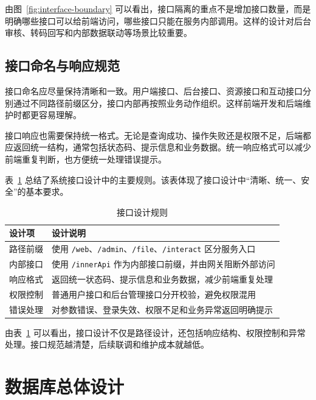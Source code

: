 由图~\ref{fig:interface-boundary} 可以看出，接口隔离的重点不是增加接口数量，而是明确哪些接口可以给前端访问，哪些接口只能在服务内部调用。这样的设计对后台审核、转码回写和内部数据联动等场景比较重要。

\subsection{接口命名与响应规范}
\label{subsec:api-response-design}

接口命名应尽量保持清晰和一致。用户端接口、后台接口、资源接口和互动接口分别通过不同路径前缀区分，接口内部再按照业务动作组织。这样前端开发和后端维护时都更容易理解。

接口响应也需要保持统一格式。无论是查询成功、操作失败还是权限不足，后端都应返回统一结构，通常包括状态码、提示信息和业务数据。统一响应格式可以减少前端重复判断，也方便统一处理错误提示。

表~\ref{tab:interface-design-rule} 总结了系统接口设计中的主要规则。该表体现了接口设计中“清晰、统一、安全”的基本要求。

\begin{table}[htbp]
  \centering
  \caption{接口设计规则}
  \label{tab:interface-design-rule}
  \begin{tabular}{p{}p{}}
    \hline
    \textbf{设计项} & \textbf{设计说明} \\
    \hline
    路径前缀 & 使用 \texttt{/web}、\texttt{/admin}、\texttt{/file}、\texttt{/interact} 区分服务入口 \\
    内部接口 & 使用 \texttt{/innerApi} 作为内部接口前缀，并由网关阻断外部访问 \\
    响应格式 & 返回统一状态码、提示信息和业务数据，减少前端重复处理 \\
    权限控制 & 普通用户接口和后台管理接口分开校验，避免权限混用 \\
    错误处理 & 对参数错误、登录失效、权限不足和业务异常返回明确提示 \\
    \hline
  \end{tabular}
\end{table}

由表~\ref{tab:interface-design-rule} 可以看出，接口设计不仅是路径设计，还包括响应结构、权限控制和异常处理。接口规范越清楚，后续联调和维护成本就越低。

\section{数据库总体设计}
\label{sec:database-overall-design}


